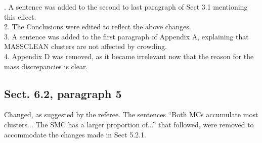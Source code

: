 \documentclass{article}
\begin{document}
. A sentence was added to the second to last paragraph of Sect 3.1
mentioning this effect.\\
2. The Conclusions were edited to reflect the above changes.\\
3. A sentence was added to the first paragraph of Appendix A, explaining that
MASSCLEAN clusters are not affected by crowding.\\
4. Appendix D was removed, as it became irrelevant now that the
reason for the mass discrepancies is clear.


\setcounter{subsection}{21}
\subsection{Sect. 6.2, paragraph 5}
Changed, as suggested by the referee. The sentences ``Both MCs accumulate most
clusters... The SMC has a larger proportion of...'' that followed, were removed
to accommodate the changes made in Sect 5.2.1.



\end{document}
